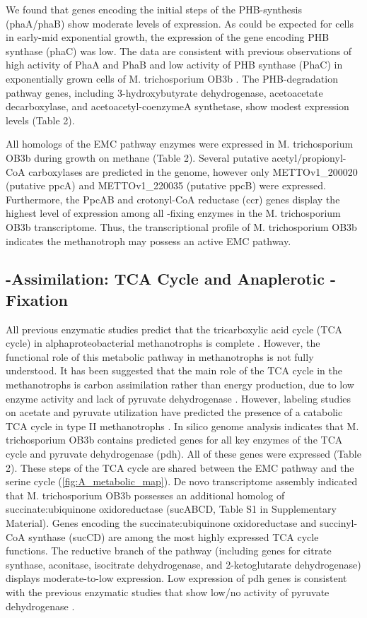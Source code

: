 We found that genes encoding the initial steps of the PHB-synthesis (phaA/phaB) show moderate levels of expression.
As could be expected for cells in early-mid exponential growth, the expression of the gene encoding PHB synthase (phaC) was low.
The data are consistent with previous observations of high activity of PhaA and PhaB and low activity of PHB synthase (PhaC) in exponentially grown cells of M. trichosporium OB3b \cite{williams1998, doronina2008}.
The PHB-degradation pathway genes, including 3-hydroxybutyrate dehydrogenase, acetoacetate decarboxylase, and acetoacetyl-coenzymeA synthetase, show modest expression levels (Table 2).

All homologs of the EMC pathway enzymes were expressed in M. trichosporium OB3b during growth on methane (Table 2).
Several putative acetyl/propionyl-CoA carboxylases are predicted in the genome, however only METTOv1\_200020 (putative ppcA) and METTOv1\_220035 (putative ppcB) were expressed.
Furthermore, the PpcAB and crotonyl-CoA reductase (ccr) genes display the highest level of expression among all -fixing enzymes in the M. trichosporium OB3b transcriptome.
Thus, the transcriptional profile of M. trichosporium OB3b indicates the methanotroph may possess an active EMC pathway.

\subsection{-Assimilation: TCA Cycle and Anaplerotic -Fixation}
All previous enzymatic studies predict that the tricarboxylic acid cycle (TCA cycle) in alphaproteobacterial methanotrophs is complete \cite{trotsenko2008}.
However, the functional role of this metabolic pathway in methanotrophs is not fully understood.
It has been suggested that the main role of the TCA cycle in the methanotrophs is carbon assimilation rather than energy production, due to low enzyme activity and lack of pyruvate dehydrogenase \cite{trotsenko1976, anthony1982, shishkina1982, trotsenko2008}.
However, labeling studies on acetate and pyruvate utilization have predicted the presence of a catabolic TCA cycle in type II methanotrophs \cite{wadzinski1975, higgins1981}.
In silico genome analysis indicates that M. trichosporium OB3b contains predicted genes for all key enzymes of the TCA cycle and pyruvate dehydrogenase (pdh).
All of these genes were expressed (Table 2).
These steps of the TCA cycle are shared between the EMC pathway and the serine cycle (\ref{fig:A_metabolic_map}).
De novo transcriptome assembly indicated that M. trichosporium OB3b possesses an additional homolog of succinate:ubiquinone oxidoreductase (sucABCD, Table S1 in Supplementary Material).
Genes encoding the succinate:ubiquinone oxidoreductase and succinyl-CoA synthase (sucCD) are among the most highly expressed TCA cycle functions.
The reductive branch of the pathway (including genes for citrate synthase, aconitase, isocitrate dehydrogenase, and 2-ketoglutarate dehydrogenase) displays moderate-to-low expression.
Low expression of pdh genes is consistent with the previous enzymatic studies that show low/no activity of pyruvate dehydrogenase \cite{trotsenko1976}.


